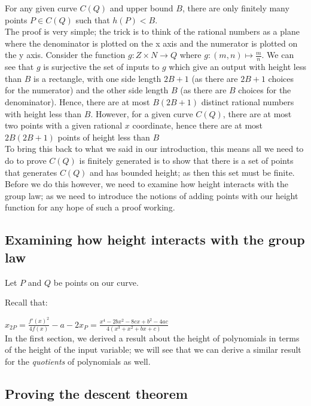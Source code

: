 \documentclass{article}
\begin{document}
For any given curve $C(Q)$ and upper bound $B$, there are only finitely many points $P \in C(Q)$ such that $h(P) < B$.\\

The proof is very simple; the trick is to think of the rational numbers as a plane where the denominator is plotted on the x axis and the numerator is plotted on the y axis. Consider the function $g: Z \times N \rightarrow Q$ where $g: (m, n) \mapsto \frac{m}{n}$. We can see that $g$ is surjective the set of inputs to $g$ which give an output with height less than $B$ is a rectangle, with one side length $2B + 1$ (as there are $2B + 1$ choices for the numerator) and the other side length $B$ (as there are $B$ choices for the denominator). Hence, there are at most $B(2B + 1)$ distinct rational numbers with height less than $B$. However, for a given curve $C(Q)$, there are at most two points with a given rational $x$ coordinate, hence there are at most $2B(2B + 1)$ points of height less than $B$\\


To bring this back to what we said in our introduction, this means all we need to do to prove $C(Q)$ is finitely generated is to show that there is a set of points that generates $C(Q)$ and has bounded height; as then this set must be finite. Before we do this however, we need to examine how height interacts with the group law; as we need to introduce the notions of adding points with our height function for any hope of such a proof working.\\

\subsection{Examining how height interacts with the group law}

Let $P$ and $Q$ be points on our curve.

Recall that:

$x_{2P} = \frac{f'(x)^2}{4 f(x)} - a - 2x_P = \frac{x^4 - 2bx^2 - 8cx + b^2 - 4ac}{4(x^3 +x^2 + bx + c)}$\\

In the first section, we derived a result about the height of polynomials in terms of the height of the input variable; we will see that we can derive a similar result for the \emph{quotients} of polynomials as well. \\

\subsection{Proving the descent theorem}
\end{document}
